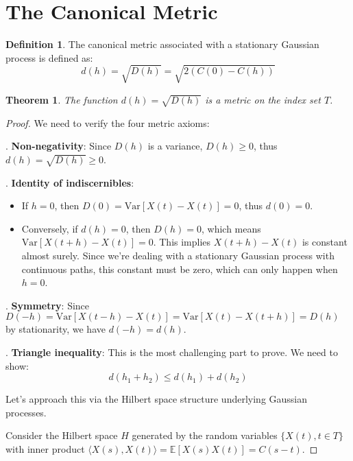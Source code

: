 \documentclass{article}
\theoremstyle{plain}
\newtheorem{theorem}{Theorem}
\theoremstyle{definition}
\newtheorem{definition}{Definition}
\begin{document}
\section{The Canonical Metric}

\begin{definition}
The canonical metric associated with a stationary Gaussian process is defined as:
\begin{equation}
d(h) = \sqrt{D(h)} = \sqrt{2(C(0) - C(h))}
\end{equation}
\end{definition}

\begin{theorem}
The function $d(h) = \sqrt{D(h)}$ is a metric on the index set $T$.
\end{theorem}

\begin{proof}
We need to verify the four metric axioms:

\medskip
{}. \textbf{Non-negativity}: Since $D(h)$ is a variance, $D(h) \geq 0$, thus $d(h) = \sqrt{D(h)} \geq 0$.

\medskip
{}. \textbf{Identity of indiscernibles}: 
\begin{itemize}
    \item If $h = 0$, then $D(0) = \text{Var}[X(t) - X(t)] = 0$, thus $d(0) = 0$.
    \item Conversely, if $d(h) = 0$, then $D(h) = 0$, which means $\text{Var}[X(t+h) - X(t)] = 0$. This implies $X(t+h) - X(t)$ is constant almost surely. Since we're dealing with a stationary Gaussian process with continuous paths, this constant must be zero, which can only happen when $h = 0$.
\end{itemize}

\medskip
{}. \textbf{Symmetry}: Since $D(-h) = \text{Var}[X(t-h) - X(t)] = \text{Var}[X(t) - X(t+h)] = D(h)$ by stationarity, we have $d(-h) = d(h)$.

\medskip
{}. \textbf{Triangle inequality}: This is the most challenging part to prove. We need to show:
\begin{equation}
d(h_1 + h_2) \leq d(h_1) + d(h_2)
\end{equation}

Let's approach this via the Hilbert space structure underlying Gaussian processes.

Consider the Hilbert space $H$ generated by the random variables $\{X(t), t \in T\}$ with inner product $\langle X(s), X(t) \rangle = \mathbb{E}[X(s)X(t)] = C(s-t)$.


\end{proof}
\end{document}
